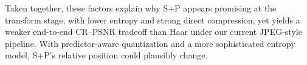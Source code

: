 Taken together, these factors explain why S+P appears promising at the transform stage, with lower entropy and strong direct compression, yet yields a weaker end-to-end CR--PSNR tradeoff than Haar under our current JPEG-style pipeline. With predictor-aware quantization and a more sophisticated entropy model, S+P’s relative position could plausibly change.
